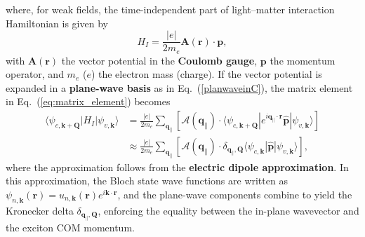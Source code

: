 where, for weak fields, the time-independent part of light--matter interaction Hamiltonian is given by~\cite{peng2022tailoring, sanchez2024enhanced}
\[
H_I=\frac{|e|}{2m_e}\boldsymbol{A}(\boldsymbol{r})\cdot\boldsymbol{p},
\]
with $\boldsymbol{A}(\boldsymbol{r})$ the vector potential in the \textbf{Coulomb gauge}, $\boldsymbol{p}$ the momentum operator, and $m_e$ ($e$) the electron mass (charge).
If the vector potential is expanded in a \textbf{plane-wave basis} as in Eq.~(\ref{planwaveinC}), the matrix element in Eq.~(\ref{eq:matrix_element}) becomes
\begin{equation}
\begin{aligned}
\langle\psi_{c, \boldsymbol{k}+\boldsymbol{Q}}|H_I|\psi_{v, \boldsymbol{k}}\rangle
&= \frac{|e|}{2m_e} 
\sum_{\boldsymbol{q}_\parallel} 
\left[ 
\boldsymbol{\mathcal{A}}(\boldsymbol{q}_\parallel)  \cdot
\langle\psi_{c, \boldsymbol{k}+\boldsymbol{Q}}|
e^{i\boldsymbol{q}_\parallel \cdot \boldsymbol{r}} 
\hat{\boldsymbol{p}} 
|\psi_{v, \boldsymbol{k}}\rangle
\right] \\
&\approx \frac{|e|}{2m_e} 
\sum_{\boldsymbol{q}_\parallel} 
\left[
\boldsymbol{\mathcal{A}}(\boldsymbol{q}_\parallel)  \cdot
\delta_{\boldsymbol{q}_\parallel,\boldsymbol{Q}} 
\langle\psi_{c, \boldsymbol{k}}| 
\hat{\boldsymbol{p}} 
|\psi_{v, \boldsymbol{k}}\rangle
\right],
\end{aligned}
\end{equation}
where the approximation follows from the \textbf{electric dipole approximation}. In this approximation, the Bloch state wave functions are written as $\psi_{n, \boldsymbol{k}}(\boldsymbol{r})=u_{n, \boldsymbol{k}}(\boldsymbol{r}) e^{i\boldsymbol{k}\cdot \boldsymbol{r}}$, and the plane-wave components combine to yield the Kronecker delta $\delta_{\boldsymbol{q}_\parallel,\boldsymbol{Q}}$, enforcing the equality between the in-plane wavevector and the exciton COM momentum.

